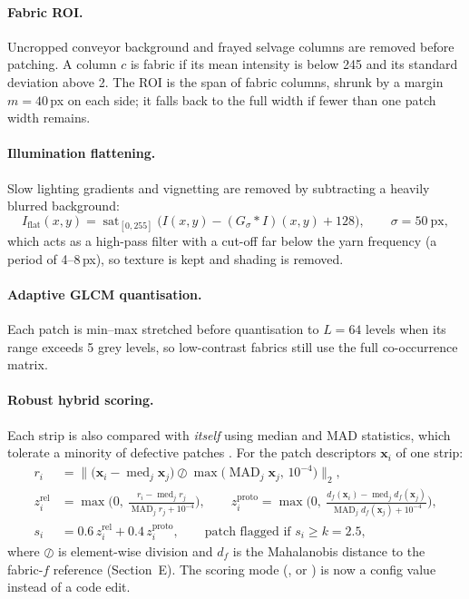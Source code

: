 \documentclass[11pt,a4paper]{article}
\newcommand{\code}[1]{\texttt{\detokenize{#1}}}
\begin{document}
\paragraph{Fabric ROI.} Uncropped conveyor background and frayed selvage columns are removed before patching. A column $c$ is fabric if its mean intensity is below 245 and its standard deviation above 2. The ROI is the span of fabric columns, shrunk by a margin $m=40$\,px on each side; it falls back to the full width if fewer than one patch width remains.

\paragraph{Illumination flattening.} Slow lighting gradients and vignetting are removed by subtracting a heavily blurred background:
\begin{equation}
I_{\text{flat}}(x,y)=\operatorname{sat}_{[0,255]}\!\Big(I(x,y)-(G_{\sigma}*I)(x,y)+128\Big),\qquad \sigma=50~\text{px},
\label{eq:flat}
\end{equation}
which acts as a high-pass filter with a cut-off far below the yarn frequency (a period of 4--8\,px), so texture is kept and shading is removed.

\paragraph{Adaptive GLCM quantisation.} Each patch is min--max stretched before quantisation to $L=64$ levels when its range exceeds 5 grey levels, so low-contrast fabrics still use the full co-occurrence matrix.

\paragraph{Robust hybrid scoring.} Each strip is also compared with \emph{itself} using median and MAD statistics, which tolerate a minority of defective patches \cite{rousseeuw1993,leys2013}. For the patch descriptors $\mathbf{x}_i$ of one strip:
\begin{align}
r_i &= \Big\| \big(\mathbf{x}_i-\operatorname{med}_j\mathbf{x}_j\big) \oslash \max\!\big(\operatorname{MAD}_j\mathbf{x}_j,\,10^{-4}\big) \Big\|_2, \label{eq:rel}\\
z^{\text{rel}}_i &= \max\!\Big(0,\ \frac{r_i-\operatorname{med}_j r_j}{\operatorname{MAD}_j r_j+10^{-4}}\Big),\qquad
z^{\text{proto}}_i = \max\!\Big(0,\ \frac{d_f(\mathbf{x}_i)-\operatorname{med}_j d_f(\mathbf{x}_j)}{\operatorname{MAD}_j d_f(\mathbf{x}_j)+10^{-4}}\Big), \label{eq:z}\\
s_i &= 0.6\,z^{\text{rel}}_i + 0.4\,z^{\text{proto}}_i,\qquad \text{patch flagged if } s_i \ge k=2.5, \label{eq:hybrid}
\end{align}
where $\oslash$ is element-wise division and $d_f$ is the Mahalanobis distance to the fabric-$f$ reference (Section~E). The scoring mode (\code{hybrid}, \code{relative} or \code{mahalanobis}) is now a config value instead of a code edit.
\end{document}
